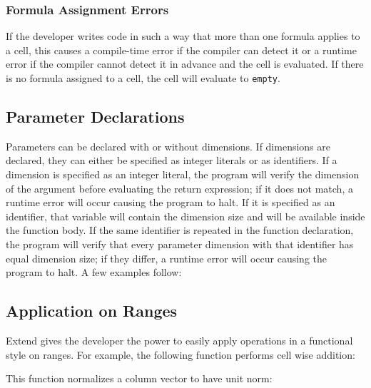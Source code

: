 \subsubsection{Formula Assignment Errors}
If the developer writes code in such a way that more than one formula applies to a cell, this causes a compile-time error if the compiler can detect it or a runtime error if the compiler cannot detect it in advance and the cell is evaluated. If there is no formula assigned to a cell, the cell will evaluate to \texttt{empty}.
\subsection{Parameter Declarations}
Parameters can be declared with or without dimensions. If dimensions are declared, they can either be specified as integer literals or as identifiers. If a dimension is specified as an integer literal, the program will verify the dimension of the argument before evaluating the return expression; if it does not match, a runtime error will occur causing the program to halt. If it is specified as an identifier, that variable will contain the dimension size and will be available inside the function body. If the same identifier is repeated in the function declaration, the program will verify that every parameter dimension with that identifier has equal dimension size; if they differ, a runtime error will occur causing the program to halt. A few examples follow:

\subsection{Application on Ranges}
Extend gives the developer the power to easily apply operations in a functional style on ranges. For example, the following function performs cell wise addition:

This function normalizes a column vector to have unit norm:

